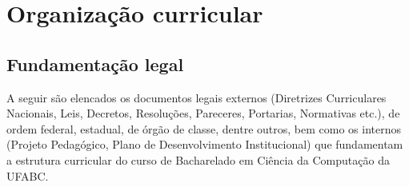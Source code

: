 \section{Organização curricular}

\subsection{Fundamentação legal}

A seguir são elencados os documentos legais externos (Diretrizes Curriculares
Nacionais, Leis, Decretos, Resoluções, Pareceres, Portarias, Normativas etc.),
de ordem federal, estadual, de órgão de classe, dentre outros, bem como os
internos (Projeto Pedagógico, Plano de Desenvolvimento Institucional) que
fundamentam a estrutura curricular do curso de Bacharelado em Ciência da
Computação da UFABC.

